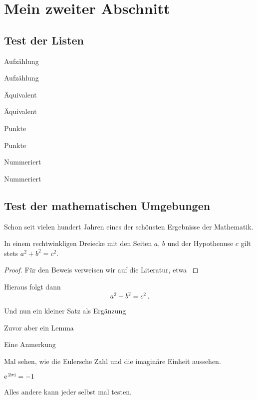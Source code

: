 \thispagestyle{empty}
\section{Mein zweiter Abschnitt}
\subsection{Test der Listen}\label{subsec:listen}
\begin{myenumerate}
\item
Aufzählung
\item
Aufzählung
\end{myenumerate}
\begin{myequivalent}
\item
Äquivalent
\item
Äquivalent
\end{myequivalent}
\begin{myitemize}
\item
Punkte
\item
Punkte
\end{myitemize}
\begin{mynumber}
\item
Nummeriert
\item
Nummeriert
\end{mynumber}
\subsection{Test der mathematischen Umgebungen}\label{subsec:mumgebungen}
Schon seit vielen hundert Jahren eines der schönsten Ergebnisse der Mathematik.
%
\begin{theorem}\label{thm:theorem1}
In einem rechtwinkligen Dreiecke mit den Seiten $ a $, $ b $ und der Hypothenuse $ c $ gilt stets
$	a^{ 2 } +b^{ 2 } = c^{ 2 } $.
\end{theorem}
%
\begin{proof}
Für den Beweis verweisen wir auf die Literatur, etwa \textcite{efhn:2016}
\end{proof}
\begin{corollary}\label{cor:folgerung}
Hieraus folgt dann 
%
\[
	a^{ 2 } + b^{ 2 } = c^{ 2 } \, .
\]
%
\end{corollary}
%
\begin{proposition}\label{prop:prop}
Und nun ein kleiner Satz als Ergänzung 
\end{proposition}
%
\begin{lemma}
Zuvor aber ein Lemma
\end{lemma}
%
\begin{remark}
Eine Anmerkung
\end{remark}
Mal sehen, wie die Eulersche Zahl und die imaginäre Einheit aussehen.
\begin{theorem}\label{thm:eim}
$ \mathrm{e\;\!}^{ 2 \pi \mathrm{i} } = -1 $
\end{theorem}
Alles andere kann jeder selbst mal testen.
%
\newpage
